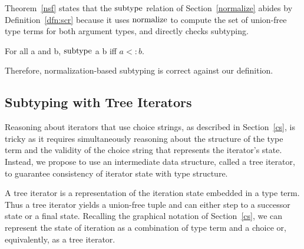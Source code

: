 \documentclass[a4paper,english]{lipics-v2019}
\renewcommand{\c}[1]{\ensuremath{\text{\lstinline{#1}}}\xspace}
\begin{document}
\noindent
Theorem~\ref{nsf} states that the \c{subtype} relation of
Section~\ref{normalize} abides by Definition~\ref{dfn:scr} because it uses
\c{normalize} to compute the set of union-free type terms for both argument
types, and directly checks subtyping.

\begin{theorem}[NF Subtyping]\label{nsf}
For all  a and b, \c{subtype} a b iff $a <: b$.
\end{theorem}

\noindent
Therefore, normalization-based subtyping is correct against our definition.


\subsection{Subtyping with Tree Iterators}

Reasoning about iterators that use choice strings, as described in
Section~\ref{cs}, is tricky as it requires simultaneously reasoning about
the structure of the type term and the validity of the choice string that
represents the iterator's state. Instead, we propose to use an intermediate
data structure, called a tree iterator, to guarantee consistency of iterator
state with type structure.

A tree iterator is a representation of the iteration state embedded in a type
term. Thus a tree iterator yields a union-free tuple and can either step to a
successor state or a final state. Recalling the graphical notation of
Section~\ref{cs}, we can represent the state of iteration as a combination of
type term and a choice or, equivalently, as a tree iterator.
\end{document}
